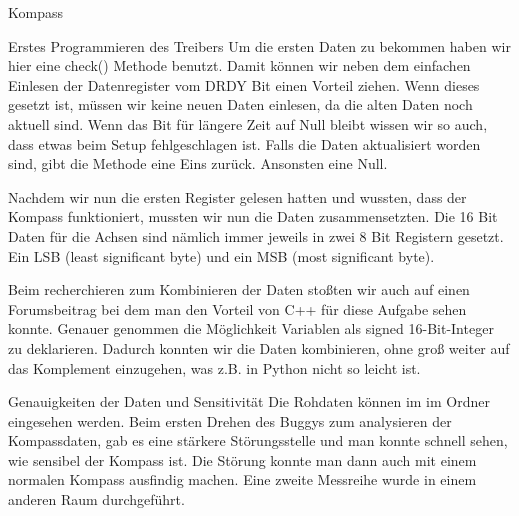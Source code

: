 \documentclass[12pt]{report}
\begin{document}
\begin{section}{Kompass}
\begin{subsection}{Erstes Programmieren des Treibers}
  Um die ersten Daten zu bekommen haben wir hier eine check() Methode benutzt. Damit können wir neben dem
  einfachen Einlesen der Datenregister vom DRDY Bit einen Vorteil ziehen. Wenn dieses gesetzt ist, müssen wir 
  keine neuen Daten einlesen, da die alten Daten noch aktuell sind. Wenn das Bit für längere Zeit auf Null bleibt
  wissen wir so auch, dass etwas beim Setup fehlgeschlagen ist.
  Falls die Daten aktualisiert worden sind, gibt die Methode eine Eins zurück. Ansonsten eine Null. 

  Nachdem wir nun die ersten Register gelesen hatten und wussten, dass der Kompass funktioniert, mussten wir nun die Daten 
  zusammensetzten. Die 16 Bit Daten für die Achsen sind nämlich immer jeweils in zwei 8 Bit Registern gesetzt. Ein 
  LSB (least significant byte) und ein MSB (most significant byte).
  
  Beim recherchieren zum Kombinieren der Daten stoßten wir auch auf einen Forumsbeitrag\cite{forumMagnet}
  bei dem man den Vorteil von C++ für diese Aufgabe sehen konnte. Genauer genommen die 
  Möglichkeit Variablen als signed 16-Bit-Integer zu deklarieren. Dadurch konnten wir die Daten kombinieren, ohne 
  groß weiter auf das Komplement einzugehen, was z.B. in Python nicht so leicht ist.
  \end{subsection}
  \begin{subsection}{Genauigkeiten der Daten und Sensitivität}
  Die Rohdaten können im \githubrepo{} im Ordner  eingesehen werden.
  Beim ersten Drehen des Buggys zum analysieren der Kompassdaten, gab es eine stärkere Störungsstelle und man 
  konnte schnell sehen, wie sensibel der Kompass ist. Die Störung konnte man dann auch mit einem normalen Kompass 
  ausfindig machen.
  Eine zweite Messreihe wurde in einem anderen Raum durchgeführt.


\end{subsection}
\end{section}
\end{document}
